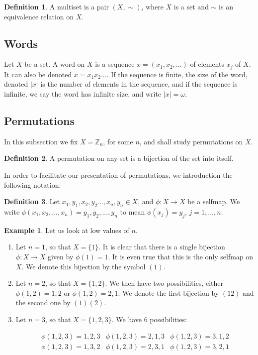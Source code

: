 \documentclass[]{article}
\theoremstyle{definition}
\newtheorem{definition}{Definition}[section]
\theoremstyle{definition}
\newtheorem{exmp}{Example}[section]
\newcommand{\raw}{\rightarrow}
\newcommand{\bb}{\mathbb}
\begin{document}
\begin{definition}
	A multiset is a pair $(X, \sim)$, where $X$ is a set and $\sim$ is an equivalence relation on $X$.
\end{definition}

\subsection{Words}

Let $X$ be a set. A word on $X$ is a sequence $x = (x_1, x_2, ...)$ of elements $x_j$ of $X$. It can also be denoted $x=x_1x_2...$. If the sequence is finite, the size of the word, denoted $|x|$ is the number of elements in the sequence, and if the sequence is infinite, we say the word has infinite size, and write $|x| = \omega$.



\subsection{Permutations}

In this subsection we fix $X = \bb{Z}_n$, for some $n$, and shall study permutations on $X$. 

\begin{definition}
	A permutation on any set is a bijection of the set into itself.
\end{definition}

In order to facilitate our presentation of permutations, we introduction the following notation:

\begin{definition}
	Let $x_1, y_1, x_2, y_2. .., x_n, y_n \in X$, and $\phi:X\raw X$ be a selfmap. We write $\phi(x_1, x_2, ..., x_n) = y_1,y_2, ..., y_n$ to mean $\phi(x_j) = y_j$, $j=1,...,n$.
\end{definition}

\begin{exmp}
	Let us look at low values of $n$.
	
	\begin{enumerate}
		\item 	Let $n=1$, so that $X = \{1\}$. It is clear that there is a single bijection $\phi: X \raw X$ given by $\phi(1)=1$. It is even true that this is the only selfmap on $X$. We denote this bijection by the symbol $(1)$.
		
		\item Let $n=2$, so that $X = \{1,2 \}$. We then have two possibilities, either $\phi(1,2)=1,2$ or $\phi(1,2)=2,1$. We denote the first bijection by $(12)$ and the second one by $(1)(2)$.
		
		\item Let $n=3$, so that $X = \{1,2, 3 \}$. We have 6 possibilities:
		
		$$\begin{array}{ccc}
		\phi(1,2,3)=1,2,3	& \phi(1,2,3)= 2,1,3 & \phi(1,2,3)= 3,1,2 \\ 
		\phi(1,2,3)= 1,3,2 & \phi(1,2,3)= 2,3,1 & \phi(1,2,3)= 3,2,1
		\end{array}$$ 
	\end{enumerate}
\end{exmp}
\end{document}
